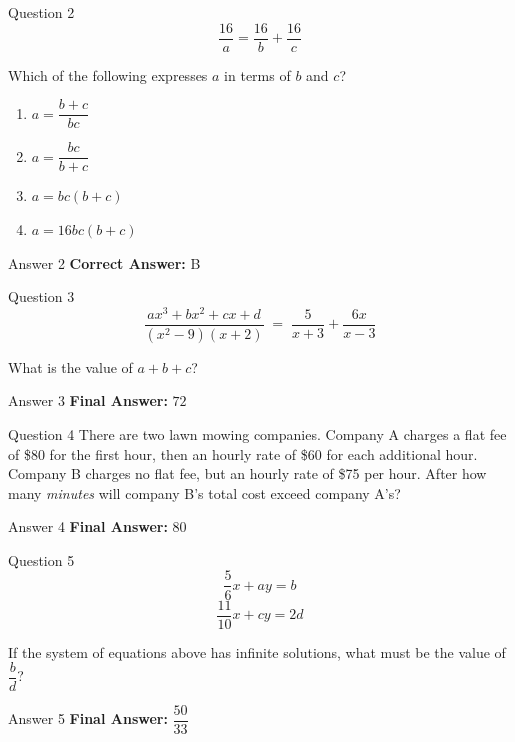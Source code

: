 \documentclass{beamer}
\begin{document}
\begin{frame}{Question 2}
\small
\[
\frac{16}{a}=\frac{16}{b}+\frac{16}{c}
\]

Which of the following expresses $a$ in terms of $b$ and $c$?
\vspace{0.35cm}
\begin{enumerate}
    \item[A.] $a=\dfrac{b+c}{bc}$
    \item[B.] $a=\dfrac{bc}{b+c}$
    \item[C.] $a=bc(b+c)$
    \item[D.] $a=16bc(b+c)$
\end{enumerate}
\end{frame}
\begin{frame}{Answer 2}
\small
\textbf{Correct Answer:} B
\end{frame}

\begin{frame}{Question 3}
\small
\[
\frac{ax^{3}+bx^{2}+cx+d}{(x^{2}-9)(x+2)}
\;=\;
\frac{5}{x+3}+\frac{6x}{x-3}
\]

What is the value of $a+b+c$?
\end{frame}
\begin{frame}{Answer 3}
\small
\textbf{Final Answer:} $\boxed{72}$
\end{frame}

\begin{frame}{Question 4}
\small
There are two lawn mowing companies. Company A charges a flat fee of \$80 for the first hour, then an hourly rate of \$60 for each additional hour.  
Company B charges no flat fee, but an hourly rate of \$75 per hour.  
After how many \textit{minutes} will company B's total cost exceed company A's?
\end{frame}
\begin{frame}{Answer 4}
\small
\textbf{Final Answer:} $\boxed{80}$
\end{frame}

\begin{frame}{Question 5}
\small
\[
\frac{5}{6}x + ay = b
\]
\[
\frac{11}{10}x + cy = 2d
\]

If the system of equations above has infinite solutions, what must be the value of $\dfrac{b}{d}$?
\end{frame}
\begin{frame}{Answer 5}
\small
\textbf{Final Answer:} $\boxed{\dfrac{50}{33}}$
\end{frame}
\end{document}
